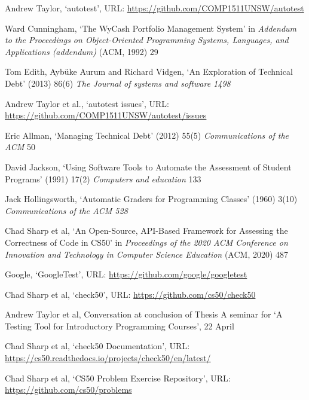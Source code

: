 \documentclass[hidelinks, 12pt]{extreport}
\begin{document}
\begin{thebibliography}{99}
	
Andrew Taylor, ‘autotest’, URL: \url{https://github.com/COMP1511UNSW/autotest}

Ward Cunningham, ‘The WyCash Portfolio Management System’ in \textit{Addendum to the Proceedings on Object-Oriented Programming Systems, Languages, and Applications (addendum)} (ACM, 1992) 29

Tom Edith, Aybüke Aurum and Richard Vidgen, ‘An Exploration of Technical Debt’ (2013) 86(6) \textit{The Journal of systems and software 1498}

Andrew Taylor et al., ‘autotest issues’, URL: \url{https://github.com/COMP1511UNSW/autotest/issues}

Eric Allman, ‘Managing Technical Debt’ (2012) 55(5) \textit{Communications of the ACM} 50

David Jackson, ‘Using Software Tools to Automate the Assessment of Student Programs’ (1991) 17(2) \textit{Computers and education} 133

Jack Hollingsworth, ‘Automatic Graders for Programming Classes’ (1960) 3(10) \textit{Communications of the ACM 528}

Chad Sharp et al, ‘An Open-Source, API-Based Framework for Assessing the Correctness of Code in CS50’ in \textit{Proceedings of the 2020 ACM Conference on Innovation and Technology in Computer Science Education} (ACM, 2020) 487

Google, ‘GoogleTest’, URL: \url{https://github.com/google/googletest}

Chad Sharp et al, ‘check50’, URL: \url{https://github.com/cs50/check50}

Andrew Taylor et al, Conversation at conclusion of Thesis A seminar for ‘A Testing Tool for Introductory Programming Courses’, 22 April

Chad Sharp et al, ‘check50 Documentation’, URL: \url{https://cs50.readthedocs.io/projects/check50/en/latest/}

Chad Sharp et al, ‘CS50 Problem Exercise Repository’, URL: \url{https://github.com/cs50/problems}


\end{thebibliography}
\end{document}
